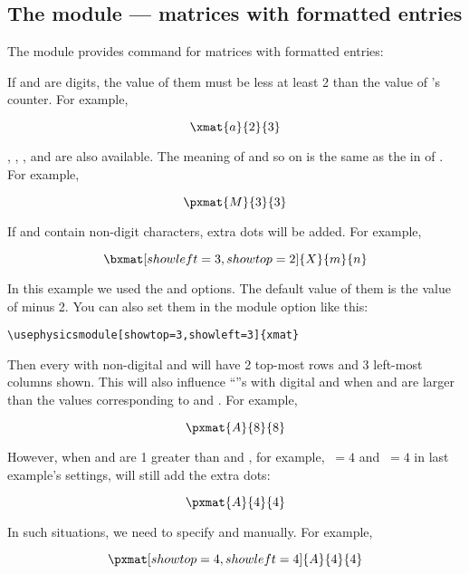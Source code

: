\documentclass[11pt,letterpaper]{article}
\begin{document}
\subsection{The  module --- matrices with formatted entries}
The  module provides  command for matrices with formatted
entries:
\begin{center}
\end{center}
If  and  are digits, the value of them
must be less at least 2 than the value of 's 
counter. For example,
\begin{example}
\[
  \xmat{a}{2}{3}
\]
\end{example}
, , ,  and  are also
available. The meaning of  and so on is the same as the 
in  of . For example,
\begin{example}
\[
  \pxmat{M}{3}{3}
\]
\end{example}
If  and  contain non-digit characters,
extra dots will be added. For example,
\begin{example}
\[
  \bxmat[showleft=3,showtop=2]
    {X}{m}{n}
\]
\end{example}
In this example we used the  and  options. The
default value of them is the value of  minus 2. You can
also set them in the module option like this:
\begin{Verbatim}
\usephysicsmodule[showtop=3,showleft=3]{xmat}
\end{Verbatim}
Then every  with non-digital  and 
will have 2 top-most rows and 3 left-most columns shown. This will also
influence ``''s with digital  and 
when  and  are larger than the values
corresponding to  and . For example,
\begin{example}
\[ \pxmat{A}{8}{8} \]
\end{example}
However, when  and  are 1 greater than
 and , for example, $\:=4$ and
$\:=4$ in last example's settings,  will still add
the extra dots:
\begin{example}
\[ \pxmat{A}{4}{4} \]
\end{example}
In such situations, we need to specify  and 
manually. For example,
\begin{example}
\[ \pxmat[showtop=4,showleft=4]
     {A}{4}{4}               \]
\end{example}
\end{document}
